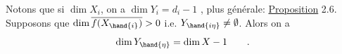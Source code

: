 Notons que si  $\dim X_i$,  on a $\dim Y_i = d_i-1$ ,  plus générale:
\uline{Proposition} 2.6. Supposons que  $\dim \overline{f(X_{\hand{i}})} > 0$ i.e. $Y_{\hand{i\eta}} \neq \emptyset$. Alors on a
\[ \dim Y_{\hand{\eta}} = \dim X - 1 \qquad . \]

